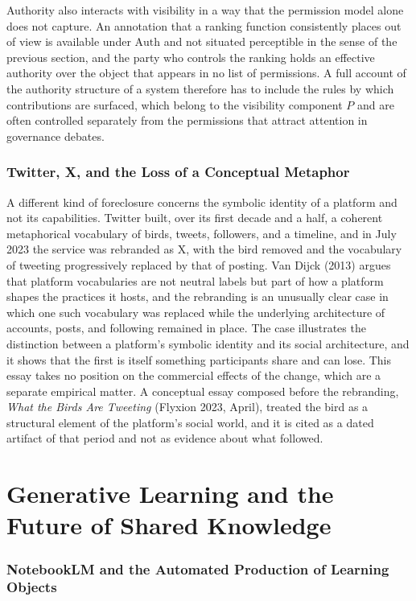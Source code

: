 \documentclass[11pt]{article}
\theoremstyle{remark}
\newcommand{\Pp}{P}
\begin{document}
Authority also interacts with visibility in a way that the permission model alone does not capture. An annotation that a ranking function consistently places out of view is available under $\mathrm{Auth}$ and not situated perceptible in the sense of the previous section, and the party who controls the ranking holds an effective authority over the object that appears in no list of permissions. A full account of the authority structure of a system therefore has to include the rules by which contributions are surfaced, which belong to the visibility component $\Pp$ and are often controlled separately from the permissions that attract attention in governance debates.

\section{Twitter, X, and the Loss of a Conceptual Metaphor}

A different kind of foreclosure concerns the symbolic identity of a platform and not its capabilities. Twitter built, over its first decade and a half, a coherent metaphorical vocabulary of birds, tweets, followers, and a timeline, and in July 2023 the service was rebranded as X, with the bird removed and the vocabulary of tweeting progressively replaced by that of posting. Van Dijck (2013) argues that platform vocabularies are not neutral labels but part of how a platform shapes the practices it hosts, and the rebranding is an unusually clear case in which one such vocabulary was replaced while the underlying architecture of accounts, posts, and following remained in place. The case illustrates the distinction between a platform's symbolic identity and its social architecture, and it shows that the first is itself something participants share and can lose. This essay takes no position on the commercial effects of the change, which are a separate empirical matter. A conceptual essay composed before the rebranding, \emph{What the Birds Are Tweeting} (Flyxion 2023, April), treated the bird as a structural element of the platform's social world, and it is cited as a dated artifact of that period and not as evidence about what followed.

\part{Generative Learning and the Future of Shared Knowledge}

\section{NotebookLM and the Automated Production of Learning Objects}
\end{document}
